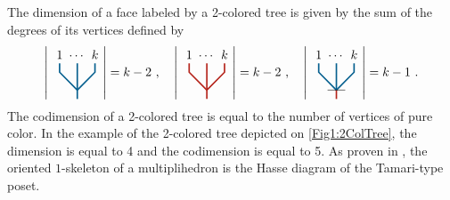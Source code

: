 \documentclass[twoside, 12pt]{amsart}
\theoremstyle{remark}
\begin{document}
The dimension of a face labeled by a 2-colored tree is given by the sum of the degrees of its vertices defined by 
\[
\left|{\vcenter{\hbox{
\begin{tikzpicture}[scale=0.5]
\draw[very thick, MidnightBlue] (0,-0.5) -- (0,1.5);
\draw[very thick, MidnightBlue] (0,0) -- (-1,1)--(-1,1.5);
\draw[very thick, MidnightBlue] (0,0) -- (1,1)--(1,1.5);
\draw (1,1.5) node[above] {$k$};
\draw (-1,1.5) node[above] {$1$};
\draw (0,1.5) node[above] {$\cdots$};
\end{tikzpicture}}}}\right|=k-2\ , \quad 
\left|{\vcenter{\hbox{
\begin{tikzpicture}[scale=0.5]
\draw[very thick, BrickRed] (0,-0.5) -- (0,1.5);
\draw[very thick, BrickRed] (0,0) -- (-1,1)--(-1,1.5);
\draw[very thick, BrickRed] (0,0) -- (1,1)--(1,1.5);
\draw (1,1.5) node[above] {$k$};
\draw (-1,1.5) node[above] {$1$};
\draw (0,1.5) node[above] {$\cdots$};
\end{tikzpicture}}}}\right|=k-2\ , \quad 
\left|{\vcenter{\hbox{
\begin{tikzpicture}[scale=0.5]
\draw[very thick, MidnightBlue] (0,0) -- (0,1.5);
\draw[very thick, MidnightBlue] (0,0) -- (-1,1)--(-1,1.5);
\draw[very thick, MidnightBlue] (0,0) -- (1,1)--(1,1.5);
\draw[very thick, BrickRed] (0,0) -- (0,-0.5);
\draw (-0.5,0)--(0.5,0);
\draw (1,1.5) node[above] {$k$};
\draw (-1,1.5) node[above] {$1$};
\draw (0,1.5) node[above] {$\cdots$};
\end{tikzpicture}}}}\right|=k-1\ .
\]
The codimension of a 2-colored tree is equal to the number of vertices of pure color. 
In the example of the 2-colored tree depicted on \cref{Fig1:2ColTree}, the dimension is equal to 4 and the codimension is equal to 5. 
As proven in \cite[Proposition 117]{CP22}, the oriented $1$-skeleton of a multiplihedron is the Hasse diagram of the Tamari-type poset. 

\medskip
\end{document}
